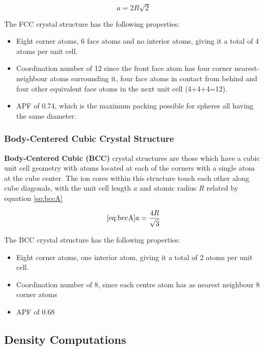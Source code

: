 \documentclass{article}
\begin{document}
\begin{equation}\label{eq:fccA}
    a = 2R\sqrt{2}
\end{equation}

The FCC crystal structure has the following properties:

\begin{itemize}
    \item Eight corner atoms, 6 face atoms and no interior atoms, giving it a total of 4 atoms per unit cell.
    \item Coordination number of 12 since the front face atom has four corner nearest-neighbour atoms surrounding it, four face atoms in contact from behind and four other equivalent face atoms in the next unit cell (4+4+4=12).
    \item APF of 0.74, which is the maximum packing possible for spheres all having the same diameter. 
\end{itemize}

\subsubsection{Body-Centered Cubic Crystal Structure}

\textbf{Body-Centered Cubic (BCC)} crystal structures are those which have a cubic unit cell geometry with atoms located at each of the corners with a single atom at the cube center. The ion cores within this structure touch each other along cube diagonals, with the unit cell length $a$ and atomic radius $R$ related by equation \ref{eq:bccA}

\begin{equation}\ref{eq:bccA}
    a = \frac{4R}{\sqrt{3}}
\end{equation}

The BCC crystal structure has the following properties:

\begin{itemize}
    \item Eight corner atoms, one interior atom, giving it a total of 2 atoms per unit cell.
    \item Coordination number of 8, since each centre atom has as nearest neighbour 8 corner atoms
    \item APF of 0.68
\end{itemize}

\subsection{Density Computations}
\end{document}
